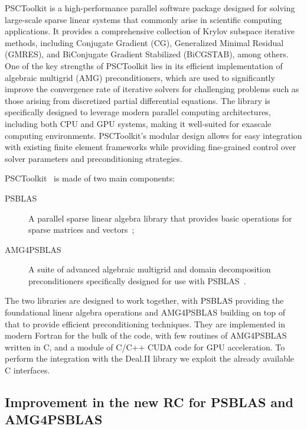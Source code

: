 \documentclass[a4paper,12pt]{article}
\begin{document}
PSCToolkit is a high-performance parallel software package designed for solving large-scale sparse linear
systems that commonly arise in scientific computing applications. It provides a comprehensive collection
of Krylov subspace iterative methods, including Conjugate Gradient (CG), Generalized Minimal Residual (GMRES),
and BiConjugate Gradient Stabilized (BiCGSTAB), among others. One of the key strengths of PSCToolkit lies
in its efficient implementation of algebraic multigrid (AMG) preconditioners, which are used to significantly
improve the convergence rate of iterative solvers for challenging problems such as those arising from
discretized partial differential equations. The library is specifically designed to leverage modern
parallel computing architectures, including both CPU and GPU systems, making it well-suited for exascale
computing environments. PSCToolkit's modular design allows for easy integration with existing finite element
frameworks while providing fine-grained control over solver parameters and preconditioning strategies.

PSCToolkit~\cite{PSCToolkit} is made of two main components:
\begin{description}
    \item[PSBLAS] A parallel sparse linear algebra library that provides basic operations for sparse matrices and vectors~\cite{PSBLAS};
    \item[AMG4PSBLAS] A suite of advanced algebraic multigrid and domain decomposition preconditioners specifically
          designed for use with PSBLAS~\cite{AMG4PSBLAS}.
\end{description}
The two libraries are designed to work together, with PSBLAS providing the foundational linear algebra operations
and AMG4PSBLAS building on top of that to provide efficient preconditioning techniques.
They are implemented in modern Fortran for the bulk of the code, with few routines of AMG4PSBLAS written in C,
and a module of C/C++ CUDA code for GPU acceleration. To perform the integration with the Deal.II library we
exploit the already available C interfaces.

\subsection{Improvement in the new RC for PSBLAS and AMG4PSBLAS}
\end{document}
